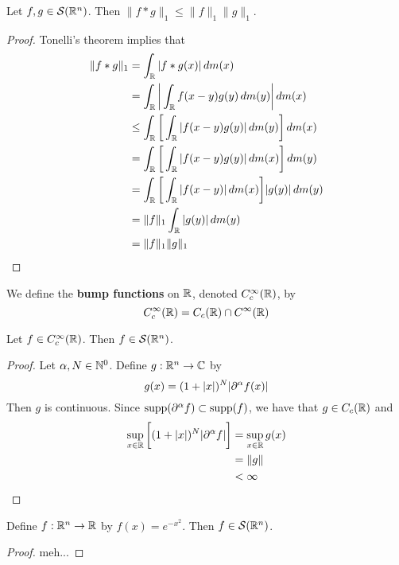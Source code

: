\documentclass{book}
\begin{document}
	\begin{ex}
		Let $f,g \in \mathcal{S}(\mathbb{R}^n)$. Then $\|f*g\|_1 \leq \|f\|_1\|g\|_1$.
	\end{ex}

	\begin{proof}
		Tonelli's theorem implies that 
		\begin{align*}
			\|f*g\|_1
			& = \int_{\mathbb{R}} |f*g(x)| \, d m(x) \\
			& = \int_{\mathbb{R}}  \bigg|\int_{\mathbb{R}} f(x-y)g(y) \, d m(y) \bigg|  \, d m(x) \\
			& \leq  \int_{\mathbb{R}} \bigg[ \int_{\mathbb{R}} |f(x-y)g(y)| \, d m(y) \bigg] \, d m(x) \\
			& = \int_{\mathbb{R}} \bigg[ \int_{\mathbb{R}} |f(x-y)g(y)| \, d m(x) \bigg] \, d m(y) \\
			& = \int_{\mathbb{R}} \bigg[ \int_{\mathbb{R}} |f(x-y)| \, d m(x) \bigg] |g(y)| \, d m(y) \\
			& = \|f\|_1 \int_{\mathbb{R}} |g(y)| \, d m(y) \\
			& = \|f\|_1\|g\|_1
		\end{align*}
	\end{proof}

	\begin{defn}
		We define the \textbf{bump functions} on $\mathbb{R}$, denoted $C_c^{\infty}(\mathbb{R})$,  by $$C_c^{\infty}(\mathbb{R}) = C_c(\mathbb{R}) \cap C^{\infty}(\mathbb{R})$$
	\end{defn}

	\begin{ex}
		Let $f \in C_c^{\infty}(\mathbb{R})$. Then $f \in \mathcal{S}(\mathbb{R}^n)$. 
	\end{ex}

	\begin{proof}
		Let $\alpha,N \in \mathbb{N}^0$. Define $g: \mathbb{R}^n \rightarrow \mathbb{C}$ by 
		$$g(x) = (1+|x|)^N |\partial^{\alpha}f(x)|$$ 
		Then $g$ is continuous. Since $\operatorname{supp}(\partial^{\alpha}f) \subset \operatorname{supp}(f)$, we have that $g \in C_c(\mathbb{R})$ and
		\begin{align*}
			\sup_{x \in \mathbb{R}} \bigg[ (1+|x|)^N |\partial^{\alpha}f|\bigg] 
			& = \sup_{x \in \mathbb{R}} g(x) \\
			& = \|g\| \\
			& < \infty
		\end{align*}
	\end{proof}

	\begin{ex}
		Define $f:\mathbb{R}^n \rightarrow \mathbb{R}$ by $f(x) = e^{-x^2}$. Then $f \in \mathcal{S}(\mathbb{R}^n)$.
	\end{ex}
	
	\begin{proof}
		meh...
	\end{proof}
	
\end{document}
